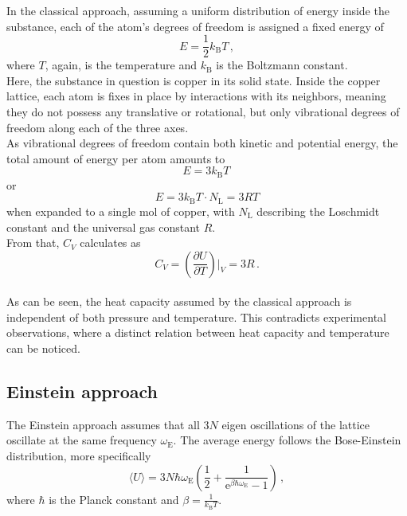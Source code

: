 In the classical approach, assuming a uniform distribution of energy inside the substance, each of the atom's degrees of freedom is assigned a fixed energy of
\begin{equation*}
    E = \frac{1}{2} k_\text{B} T \,,
\end{equation*}
where $T$, again, is the temperature and $k_\text{B}$ is the Boltzmann constant. \\

Here, the substance in question is copper in its solid state.
Inside the copper lattice, each atom is fixes in place by interactions with its neighbors, meaning they do not possess any translative or rotational, but only vibrational degrees of freedom along each of the three axes. \\
As vibrational degrees of freedom contain both kinetic and potential energy, the total amount of energy per atom amounts to
\begin{equation*}
    E = 3 k_\text{B} T \,
\end{equation*}
or
\begin{equation*}
    E = 3 k_\text{B} T \cdot N_\text{L} = 3 R T
\end{equation*}
when expanded to a single mol of copper, with $N_\text{L}$ describing the Loschmidt constant and the universal gas constant $R$.\\
From that, $C_V$ calculates as
\begin{equation*}
    C_V = \left( \frac{\partial U}{\partial T} \right) \big \vert _V = 3 R \,.
\end{equation*} \\

As can be seen, the heat capacity assumed by the classical approach is independent of both pressure and temperature.
This contradicts experimental observations, where a distinct relation between heat capacity and temperature can be noticed. 

\subsection{Einstein approach}

The Einstein approach assumes that all $3N$ eigen oscillations of the lattice oscillate at the same frequency $\omega_\text{E}$.
The average energy follows the Bose-Einstein distribution, more specifically
\begin{equation*}
   \langle U \rangle = 3 N \hbar \omega_\text{E} \left(\frac{1}{2} + \frac{1}{\text{e}^{\beta \hbar \omega_\text{E}} - 1} \right) \,,
\end{equation*}
where $\hbar$ is the Planck constant and $\beta = \frac{1}{k_\text{B} T}$. \\

